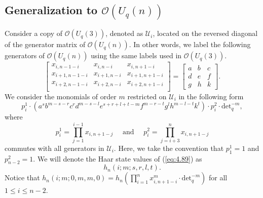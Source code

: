 \documentclass[table,a4paper,reqno]{amsart}
\numberwithin{equation}{section}
\theoremstyle{definition}
\begin{document}

\subsection{Generalization to $\mathcal{O}(U_q(n))$}
Consider a copy of $\mathcal{O}(U_q(3))$, denoted as $\mathcal{U}_i$, located on the reversed diagonal of the generator matrix of $\mathcal{O}(U_q(n))$. In other words, we label the following generators of $\mathcal{O}(U_q(n))$ using the same labels used in $\mathcal{O}(U_q(3))$.
\begin{equation}
    \begin{bmatrix}
        x_{i,n-1-i}&x_{i,n-i}&x_{i,n+1-i}\\
        x_{i+1,n-1-i}&x_{i+1,n-i}&x_{i+1,n+1-i}\\
        x_{i+2,n-1-i}&x_{i+2,n-i}&x_{i+2,n+1-i}\\
    \end{bmatrix}=\begin{bmatrix}
        a&b&c\\
        d&e&f\\
        g&h&k
    \end{bmatrix}.
\end{equation}
We consider the monomials of order $m$ restricted on $\mathcal{U}_i$ in the following form 
\begin{equation}\label{eq:4.89}
    p_i^1\cdot\left(a^sb^{m-s-r}c^rd^{m-s-l}e^{s+r+l+t-m}f^{m-r-t}g^lh^{m-l-t}k^t\right)\cdot p_i^2\cdot\text{det}_q^{-m},
\end{equation}
where
\begin{equation}
        p_i^1=\prod_{j=1}^{i-1}x_{i,n+1-j} \quad\text{ and }\quad p_i^2=\prod_{j=i+3}^{n}x_{i,n+1-j}
\end{equation}
commutes with all generators in $\mathcal{U}_i$. Here, we take the convention that $p_1^1=1$ and $p_{n-2}^2=1$. We will denote the Haar state values of (\ref{eq:4.89}) as
\begin{equation}
    h_n(i;m;s,r,l,t).
\end{equation}
Notice that $h_n(i;m;0,m,m,0)=h_n(\prod_{i=1}^nx^m_{i,n+1-i}\cdot\text{det}_q^{-m})$ for all $1\le i\le n-2$.
\end{document}
